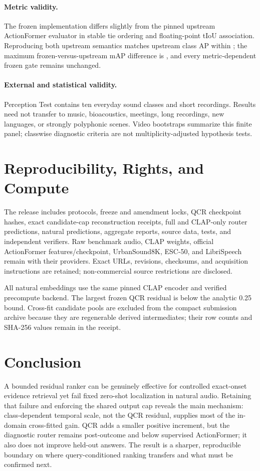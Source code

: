 \documentclass[journal,10pt]{IEEEtran}
\begin{document}
\paragraph{Metric validity.}
The frozen implementation differs slightly from the pinned upstream
ActionFormer evaluator in stable tie ordering and floating-point tIoU
association. Reproducing both upstream semantics matches upstream class AP
within \UpstreamReproductionDifference; the maximum frozen-versus-upstream
mAP difference is \UpstreamMaximumDifference, and every metric-dependent
frozen gate remains unchanged.

\paragraph{External and statistical validity.}
Perception Test contains ten everyday sound classes and short recordings.
Results need not transfer to music, bioacoustics, meetings, long recordings,
new languages, or strongly polyphonic scenes. Video bootstraps summarize this
finite panel; classwise diagnostic criteria are not multiplicity-adjusted
hypothesis tests.

\section{Reproducibility, Rights, and Compute}
The release includes protocols, freeze and amendment locks, QCR checkpoint
hashes, exact candidate-cap reconstruction receipts, full and CLAP-only
router predictions, natural predictions, aggregate reports, source data,
tests, and independent verifiers. Raw benchmark audio, CLAP weights, official
ActionFormer features/checkpoint, UrbanSound8K, ESC-50, and LibriSpeech remain
with their providers. Exact URLs, revisions, checksums, and acquisition
instructions are retained; non-commercial source restrictions are disclosed.

All natural embeddings use the same pinned CLAP encoder and verified
precompute backend. The largest frozen QCR residual is below the analytic
0.25 bound. Cross-fit candidate pools are excluded from the compact
submission archive because they are regenerable derived intermediates; their
row counts and SHA-256 values remain in the receipt.

\section{Conclusion}
A bounded residual ranker can be genuinely effective for controlled
exact-onset evidence retrieval yet fail fixed zero-shot localization in
natural audio. Retaining that failure and enforcing the shared output cap
reveals the main mechanism: class-dependent temporal scale, not the QCR
residual, supplies most of the in-domain cross-fitted gain. QCR adds a smaller
positive increment, but the diagnostic router remains post-outcome and below
supervised ActionFormer; it also does not improve held-out answers. The result
is a sharper, reproducible boundary on where query-conditioned ranking
transfers and what must be confirmed next.
\end{document}
